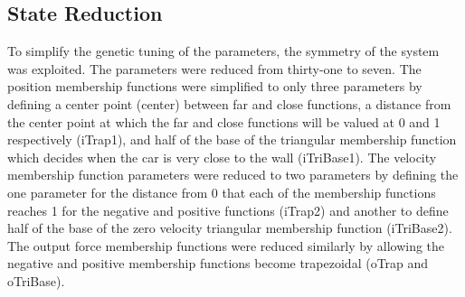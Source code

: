 \subsection{State Reduction} To simplify the genetic tuning of the parameters, the symmetry of the system
was exploited. The parameters were reduced from thirty-one to seven. The position membership functions were
simplified to only three parameters by defining a center point (center) between far and close functions, a
distance from the center point at which the far and close functions will be valued at 0 and 1 respectively
(iTrap1), and half of the base of the triangular membership function which decides when the car is very close
to the wall (iTriBase1). The velocity membership function parameters were reduced to two parameters by
defining the one parameter for the distance from 0 that each of the membership functions reaches 1 for the
negative and positive functions (iTrap2) and another to define half of the base of the zero velocity
triangular membership function (iTriBase2). The output force membership functions were reduced similarly by
allowing the negative and positive membership functions become trapezoidal (oTrap and oTriBase). 

